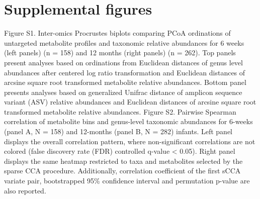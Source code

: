 \section{Supplemental figures}
Figure S1. Inter-omics Procrustes biplots comparing PCoA ordinations of untargeted metabolite profiles and taxonomic relative abundances for 6 weeks (left panels) (n = 158) and 12 months (right panels) (n = 262). Top panels present analyses based on ordinations from Euclidean distances of genus level abundances after centered log ratio transformation and Euclidean distances of arcsine square root transformed metabolite relative abundances. Bottom panel presents analyses based on generalized Unifrac distance of amplicon sequence variant (ASV) relative abundances and Euclidean distances of arcsine square root transformed metabolite relative abundances.
Figure S2. Pairwise Spearman correlation of metabolite bins and genus-level taxonomic abundances for 6-weeks (panel A, N = 158) and 12-months (panel B, N = 282) infants. Left panel displays the overall correlation pattern, where non-significant correlations are not colored (false discovery rate (FDR) controlled q-value < 0.05). Right panel displays the same heatmap restricted to taxa and metabolites selected by the sparse CCA procedure. Additionally, correlation coefficient of the first sCCA variate pair, bootstrapped 95\% confidence interval and permutation p-value are also reported. 

